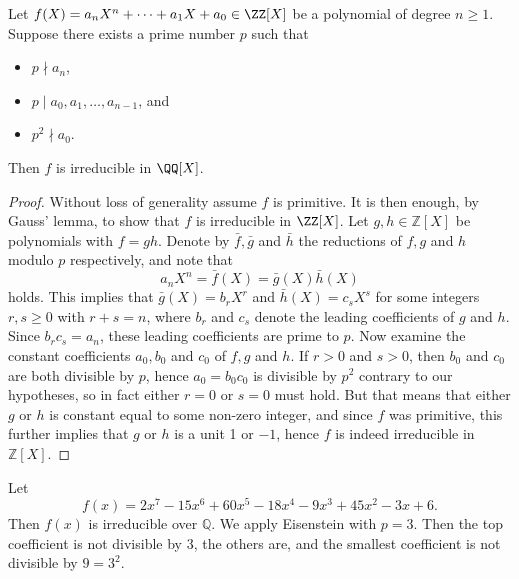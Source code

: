 \documentclass[12pt, a4paper]{article}
\begin{document}
\begin{mdthm}
    Let \(f(X)=a_n X^n+\cdots+a_1X+a_0 \in \ZZ[X]\) be a polynomial of degree \(n\geq 1\). Suppose there exists a prime number \(p\) such that 
    \begin{itemize}
        \item \(p\nmid a_n\),
        \item \(p \mid a_0,a_1,\ldots,a_{n-1}\), and 
        \item \(p^2 \nmid a_0\).
    \end{itemize} Then \(f\) is irreducible in \(\QQ[X]\).
\end{mdthm}

\begin{proof}
    Without loss of generality assume \(f\) is primitive. It is then enough, by Gauss' lemma, to show that \(f\) is irreducible in \(\ZZ[X]\).
    Let \( g, h \in \mathbb{Z}[X] \) be polynomials with \( f = gh \). Denote by \( \bar{f}, \bar{g} \) and \( \bar{h} \) the reductions of \( f, g \) and \( h \) modulo \( p \) respectively, and note that
    \[
    a_nX^n = \bar{f}(X) = \bar{g}(X)\bar{h}(X)
    \]
    holds. This implies that \( \bar{g}(X) = b_rX^r \) and \( \bar{h}(X) = c_sX^s \) for some integers \( r, s \geq 0 \) with \( r + s = n \), where \( b_r \) and \( c_s \) denote the leading coefficients of \( g \) and \( h \). Since \( b_rc_s = a_n \), these leading coefficients are prime to \( p \). Now examine the constant coefficients \( a_0, b_0 \) and \( c_0 \) of \( f, g \) and \( h \). If \( r > 0 \) and \( s > 0 \), then \( b_0 \) and \( c_0 \) are both divisible by \( p \), hence \( a_0 = b_0c_0 \) is divisible by \( p^2 \) contrary to our hypotheses, so in fact either \( r = 0 \) or \( s = 0 \) must hold. But that means that either \( g \) or \( h \) is constant equal to some non-zero integer, and since \( f \) was primitive, this further implies that \( g \) or \( h \) is a unit 1 or \(-1\), hence \( f \) is indeed irreducible in \( \mathbb{Z}[X] \). 
\end{proof}

\begin{mdexample}
    Let
    \[
    f(x) = 2x^7 - 15x^6 + 60x^5 - 18x^4 - 9x^3 + 45x^2 - 3x + 6.
    \]
    Then \( f(x) \) is irreducible over \( \mathbb{Q} \). We apply Eisenstein with \( p = 3 \). Then the top coefficient is not divisible by 3, the others are, and the smallest coefficient is not divisible by \( 9 = 3^2 \).
\end{mdexample}
\end{document}
